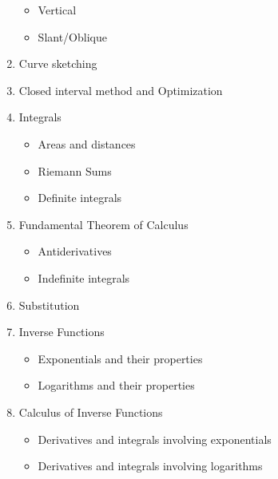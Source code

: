 \documentclass[12pt]{amsart}
\begin{document}
\begin{multicols}{2}
\begin{enumerate}[1.]
\begin{itemize}
  \item
    Vertical
  \item
    Slant/Oblique
  \end{itemize}
\item
  Curve sketching
\item
  Closed interval method and Optimization
\item
  Integrals
  \begin{itemize}
  \item
    Areas and distances
  \item
    Riemann Sums
  \item
    Definite integrals
  \end{itemize}
\item
  Fundamental Theorem of Calculus
  \begin{itemize}
  \item
    Antiderivatives
  \item
    Indefinite integrals
  \end{itemize}
\item
  Substitution
\item
  Inverse Functions
  \begin{itemize}
  \item
    Exponentials and their properties
  \item
    Logarithms and their properties
  \end{itemize}
\item
  Calculus of Inverse Functions
  \begin{itemize}
  \item
    Derivatives and integrals involving exponentials
  \item
    Derivatives and integrals involving logarithms
  \end{itemize}
  \end{enumerate}
\end{multicols}
\end{document}
